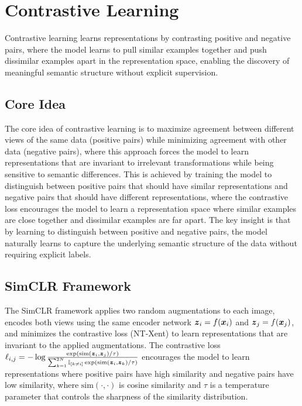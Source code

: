 
\section{Contrastive Learning }
\label{sec:contrastive-learning}

Contrastive learning learns representations by contrasting positive and negative pairs, where the model learns to pull similar examples together and push dissimilar examples apart in the representation space, enabling the discovery of meaningful semantic structure without explicit supervision.

\subsection{Core Idea}

The core idea of contrastive learning is to maximize agreement between different views of the same data (positive pairs) while minimizing agreement with other data (negative pairs), where this approach forces the model to learn representations that are invariant to irrelevant transformations while being sensitive to semantic differences. This is achieved by training the model to distinguish between positive pairs that should have similar representations and negative pairs that should have different representations, where the contrastive loss encourages the model to learn a representation space where similar examples are close together and dissimilar examples are far apart. The key insight is that by learning to distinguish between positive and negative pairs, the model naturally learns to capture the underlying semantic structure of the data without requiring explicit labels.

\subsection{SimCLR Framework}

The SimCLR framework applies two random augmentations to each image, encodes both views using the same encoder network $\boldsymbol{z}_i = f(\boldsymbol{x}_i)$ and $\boldsymbol{z}_j = f(\boldsymbol{x}_j)$, and minimizes the contrastive loss (NT-Xent) to learn representations that are invariant to the applied augmentations. The contrastive loss $\ell_{i,j} = -\log \frac{\exp(\text{sim}(\boldsymbol{z}_i, \boldsymbol{z}_j)/\tau)}{\sum_{k=1}^{2N} \mathbb{I}_{[k \neq i]} \exp(\text{sim}(\boldsymbol{z}_i, \boldsymbol{z}_k)/\tau)}$ encourages the model to learn representations where positive pairs have high similarity and negative pairs have low similarity, where $\text{sim}(\cdot, \cdot)$ is cosine similarity and $\tau$ is a temperature parameter that controls the sharpness of the similarity distribution.

